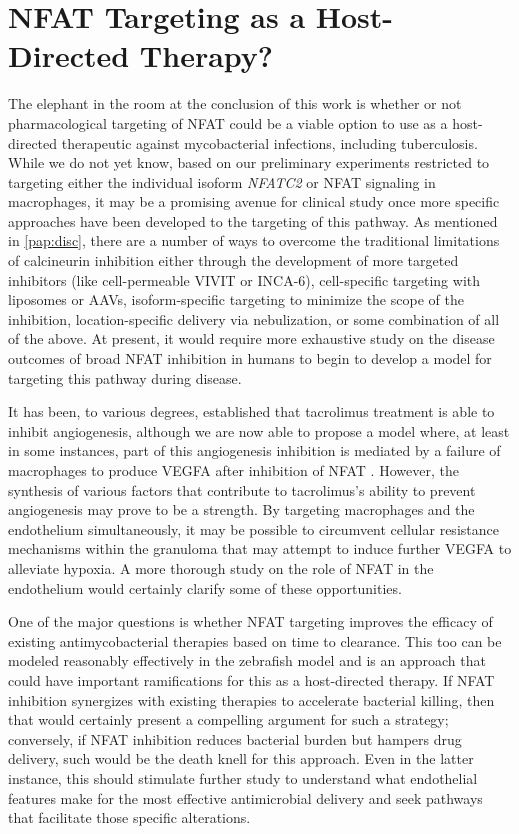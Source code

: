 \section{NFAT Targeting as a Host\hyp{}Directed Therapy?}\label{nfathdt}

The elephant in the room at the conclusion of this work is whether or not pharmacological targeting of NFAT could be a viable option to use as a host\hyp{}directed therapeutic against mycobacterial infections, including tuberculosis. While we do not yet know, based on our preliminary experiments restricted to targeting either the individual isoform \textit{NFATC2} or NFAT signaling in macrophages, it may be a promising avenue for clinical study once more specific approaches have been developed to the targeting of this pathway. As mentioned in \autoref{pap:disc}, there are a number of ways to overcome the traditional limitations of calcineurin inhibition either through the development of more targeted inhibitors (like cell\hyp{}permeable VIVIT or INCA\hyp{}6), cell\hyp{}specific targeting with liposomes or AAVs, isoform\hyp{}specific targeting to minimize the scope of the inhibition, location\hyp{}specific delivery via nebulization, or some combination of all of the above. At present, it would require more exhaustive study on the disease outcomes of broad NFAT inhibition in humans to begin to develop a model for targeting this pathway during disease.

It has been, to various degrees, established that tacrolimus treatment is able to inhibit angiogenesis, although we are now able to propose a model where, at least in some instances, part of this angiogenesis inhibition is mediated by a failure of macrophages to produce VEGFA after inhibition of NFAT \citep{Shen2022, Turgut2011}. However, the synthesis of various factors that contribute to tacrolimus's ability to prevent angiogenesis may prove to be a strength. By targeting macrophages and the endothelium simultaneously, it may be possible to circumvent cellular resistance mechanisms within the granuloma that may attempt to induce further VEGFA to alleviate hypoxia. A more thorough study on the role of NFAT in the endothelium would certainly clarify some of these opportunities. 

One of the major questions is whether NFAT targeting improves the efficacy of existing antimycobacterial therapies based on time to clearance. This too can be modeled reasonably effectively in the zebrafish model and is an approach that could have important ramifications for this as a host\hyp{}directed therapy. If NFAT inhibition synergizes with existing therapies to accelerate bacterial killing, then that would certainly present a compelling argument for such a strategy; conversely, if NFAT inhibition reduces bacterial burden but hampers drug delivery, such would be the death knell for this approach. Even in the latter instance, this should stimulate further study to understand what endothelial features make for the most effective antimicrobial delivery and seek pathways that facilitate those specific alterations.

